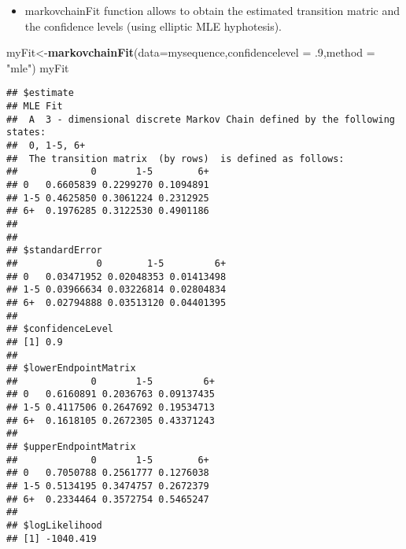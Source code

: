 \documentclass[ignorenonframetext,]{beamer}
\newenvironment{Shaded}{\begin{snugshade}}{\end{snugshade}}
\newcommand{\DataTypeTok}[1]{\textcolor[rgb]{0.13,0.29,0.53}{#1}}
\newcommand{\FloatTok}[1]{\textcolor[rgb]{0.00,0.00,0.81}{#1}}
\newcommand{\KeywordTok}[1]{\textcolor[rgb]{0.13,0.29,0.53}{\textbf{#1}}}
\newcommand{\NormalTok}[1]{#1}
\newcommand{\StringTok}[1]{\textcolor[rgb]{0.31,0.60,0.02}{#1}}
\providecommand{\tightlist}{%
  \setlength{\itemsep}{0pt}\setlength{\parskip}{0pt}}
\providecommand{\tightlist}{
  \setlength{\itemsep}{0pt}\setlength{\parskip}{0pt}
}
\begin{document}
\begin{frame}[fragile]

\begin{itemize}
\tightlist
\item
  markovchainFit function allows to obtain the estimated transition
  matric and the confidence levels (using elliptic MLE hyphotesis).
\end{itemize}

\begin{Shaded}
\begin{Highlighting}[]
\NormalTok{myFit<-}\KeywordTok{markovchainFit}\NormalTok{(}\DataTypeTok{data=}\NormalTok{mysequence,}\DataTypeTok{confidencelevel =} \FloatTok{.9}\NormalTok{,}\DataTypeTok{method =} \StringTok{"mle"}\NormalTok{)}
\NormalTok{myFit}
\end{Highlighting}
\end{Shaded}

\begin{verbatim}
## $estimate
## MLE Fit 
##  A  3 - dimensional discrete Markov Chain defined by the following states: 
##  0, 1-5, 6+ 
##  The transition matrix  (by rows)  is defined as follows: 
##             0       1-5        6+
## 0   0.6605839 0.2299270 0.1094891
## 1-5 0.4625850 0.3061224 0.2312925
## 6+  0.1976285 0.3122530 0.4901186
## 
## 
## $standardError
##              0        1-5         6+
## 0   0.03471952 0.02048353 0.01413498
## 1-5 0.03966634 0.03226814 0.02804834
## 6+  0.02794888 0.03513120 0.04401395
## 
## $confidenceLevel
## [1] 0.9
## 
## $lowerEndpointMatrix
##             0       1-5         6+
## 0   0.6160891 0.2036763 0.09137435
## 1-5 0.4117506 0.2647692 0.19534713
## 6+  0.1618105 0.2672305 0.43371243
## 
## $upperEndpointMatrix
##             0       1-5        6+
## 0   0.7050788 0.2561777 0.1276038
## 1-5 0.5134195 0.3474757 0.2672379
## 6+  0.2334464 0.3572754 0.5465247
## 
## $logLikelihood
## [1] -1040.419
\end{verbatim}

\end{frame}
\end{document}
